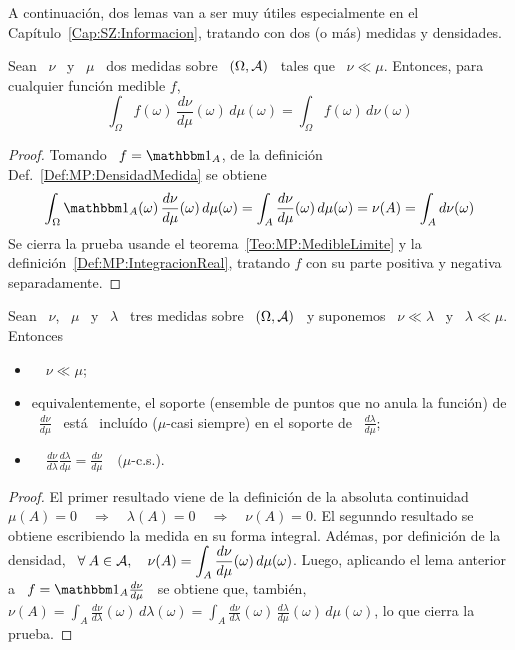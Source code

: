 A  continuaci\'on,  dos  lemas  van  a  ser muy  \'utiles  especialmente  en  el
Cap\'itulo~\ref{Cap:SZ:Informacion},  tratando  con  dos  (o  m\'as)  medidas  y
densidades.
%
\begin{lema}
\label{Lem:RelacionIntegracionDerivadasRadon}
%
  Sean \  $\nu$ \ y \  $\mu$ \ dos medidas  sobre \ $(\Omega,\mathcal{A})$ \  tales que \
  $\nu \ll \mu$. Entonces, para cualquier funci\'on medible $f$,
  \[
  \int_\Omega   f(\omega)  \,   \frac{d\nu}{d\mu}(\omega)   \,  d\mu(\omega)   =
  \int_\Omega f(\omega) \, d\nu(\omega)
  \]
\end{lema}
%
\begin{proof}
  Tomando \ $f =  \un_A$, de la definici\'on Def.~\ref{Def:MP:DensidadMedida} se
  obtiene
  \[
  \int_\Omega  \un_A(\omega)  \,  \frac{d\nu}{d\mu}(\omega)  \,  d\mu(\omega)  =
  \int_A   \frac{d\nu}{d\mu}(\omega)   \,  d\mu(\omega)   =   \nu(A)  =   \int_A
  d\nu(\omega)
  \]
  Se  cierra  la  prueba   usande  el  teorema~\ref{Teo:MP:MedibleLimite}  y  la
  definici\'on~\ref{Def:MP:IntegracionReal}, tratando $f$  con su parte positiva
  y negativa separadamente.
\end{proof}
%
\begin{lema}
\label{Lem:RelacionesDerivadasRadon}
%
  Sean \ $\nu$, \ $\mu$ \ y \ $\lambda$ \ tres medidas sobre \ $(\Omega,\mathcal{A})$ \ y
  suponemos \ $\nu \ll \lambda$ \ y \ $\lambda \ll \mu$. Entonces
  \begin{itemize}
  \item $\quad \nu \ll \mu$;
  \item  equivalentemente,  el soporte  (ensemble  de  puntos  que no  anula  la
    funci\'on)  de \  $\displaystyle  \frac{d\nu}{d\mu}$ \  est\'a \  inclu\'ido
    ($\mu$-casi    siempre)    en     el    soporte    de    \    $\displaystyle
    \frac{d\lambda}{d\mu}$;
  \item  $\quad   \displaystyle  \frac{d\nu}{d\lambda}  \frac{d\lambda}{d\mu}  =
    \frac{d\nu}{d\mu} \quad (\mu$-c.s.).
\end{itemize}
\end{lema}
%
\begin{proof}
  El  primer resultado  viene  de  la definici\'on  de  la absoluta  continuidad
  $\mu(A) =  0 \quad  \Rightarrow \quad \lambda(A)  = 0 \quad  \Rightarrow \quad
  \nu(A) =  0$. El  segunndo resultado  se obtiene escribiendo  la medida  en su
  forma integral.   Ad\'emas, por definici\'on de la  densidad, \ $\displaystyle
  \forall  \: A  \in  \mathcal{A},  \quad \nu(A)  =  \int_A \frac{d\nu}{d\mu}(\omega)  \,
  d\mu(\omega)$.   Luego,   aplicando  el   lema  anterior  a   \  $f   =  \un_A
  \frac{d\nu}{d\mu}$  \ se  obtiene que,  tambi\'en, \  $\displaystyle  \nu(A) =
  \int_A    \frac{d\nu}{d\lambda}(\omega)   \,    d\lambda(\omega)    =   \int_A
  \frac{d\nu}{d\lambda}(\omega)      \,     \frac{d\lambda}{d\mu}(\omega)     \,
  d\mu(\omega)$, lo que cierra la prueba.
\end{proof}

